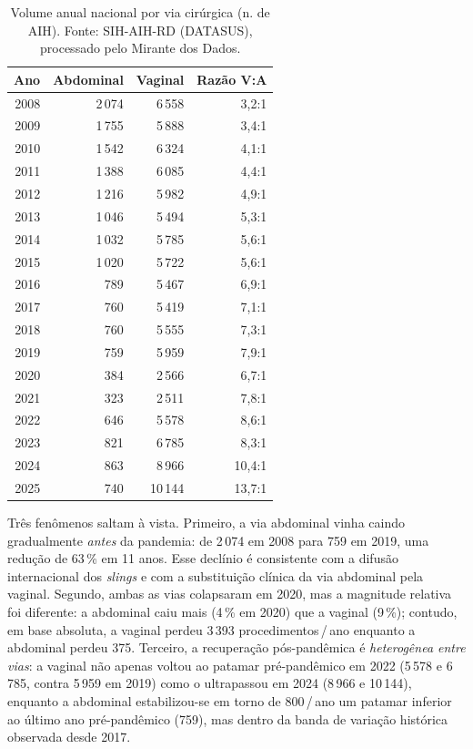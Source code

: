 \documentclass[12pt,a4paper,oneside]{article}
\begin{document}
\begin{table}[H]
\centering
\caption{Volume anual nacional por via cirúrgica (n. de AIH).
Fonte: SIH-AIH-RD (DATASUS), processado pelo Mirante dos Dados.}
\label{tab:nat-aih}
\small
\begin{tabular}{rrrr}
\toprule
\textbf{Ano} & \textbf{Abdominal} & \textbf{Vaginal} & \textbf{Razão V:A} \\
\midrule
2008 & 2\,074 & 6\,558  &  3{,}2:1 \\
2009 & 1\,755 & 5\,888  &  3{,}4:1 \\
2010 & 1\,542 & 6\,324  &  4{,}1:1 \\
2011 & 1\,388 & 6\,085  &  4{,}4:1 \\
2012 & 1\,216 & 5\,982  &  4{,}9:1 \\
2013 & 1\,046 & 5\,494  &  5{,}3:1 \\
2014 & 1\,032 & 5\,785  &  5{,}6:1 \\
2015 & 1\,020 & 5\,722  &  5{,}6:1 \\
2016 &   789  & 5\,467  &  6{,}9:1 \\
2017 &   760  & 5\,419  &  7{,}1:1 \\
2018 &   760  & 5\,555  &  7{,}3:1 \\
2019 &   759  & 5\,959  &  7{,}9:1 \\
2020 &   384  & 2\,566  &  6{,}7:1 \\
2021 &   323  & 2\,511  &  7{,}8:1 \\
2022 &   646  & 5\,578  &  8{,}6:1 \\
2023 &   821  & 6\,785  &  8{,}3:1 \\
2024 &   863  & 8\,966  & 10{,}4:1 \\
2025 &   740  & 10\,144 & 13{,}7:1 \\
\bottomrule
\end{tabular}
\end{table}

Três fenômenos saltam à vista. Primeiro, a via abdominal vinha
caindo gradualmente \textit{antes} da pandemia: de 2\,074 em 2008
para 759 em 2019, uma redução de 63\,\% em 11 anos. Esse declínio
é consistente com a difusão internacional dos \textit{slings} e
com a substituição clínica da via abdominal pela vaginal. Segundo,
ambas as vias colapsaram em 2020, mas a magnitude
relativa foi diferente: a abdominal caiu mais (4\,\%
em 2020) que a vaginal (9\,\%); contudo, em base
absoluta, a vaginal perdeu 3\,393 procedimentos\,/\,ano enquanto
a abdominal perdeu 375. Terceiro, a recuperação pós-pandêmica é
\textit{heterogênea entre vias}: a vaginal não apenas voltou ao
patamar pré-pandêmico em 2022 (5\,578 e 6\,785,
contra 5\,959 em 2019) como o ultrapassou em 2024
(8\,966 e 10\,144), enquanto a abdominal estabilizou-se em torno
de 800\,/\,ano \textemdash{} um patamar inferior ao último ano
pré-pandêmico (759), mas dentro da banda de variação histórica
observada desde 2017.
\end{document}
